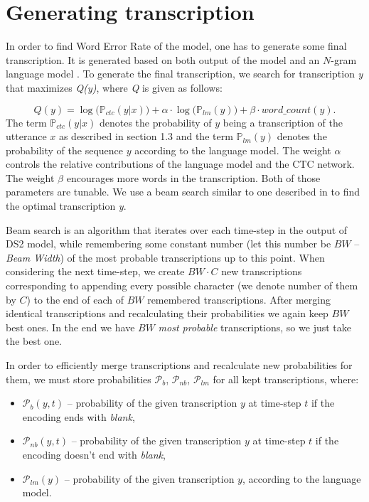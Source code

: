 \documentclass[licencjacka,en]{pracamgr}
\begin{document}
\section{Generating transcription} \label{sec:transcription}
In order to find Word Error Rate of the model, one has to generate some final transcription. It is generated based on both output of the model and an $N$-gram language model \cite{DS9}. To generate the final transcription, we search for transcription \textit{y} that maximizes \textit{Q(y)}, where \textit{Q} is given as follows:

$$
Q(y) = \log \big(\mathbb{P}_{ctc}(y|x)\big) + \alpha \cdot \log \big( \mathbb{P}_{lm}(y) \big) + \beta \cdot word\_count(y).
$$
The term $\mathbb{P}_{ctc}(y|x)$ denotes the probability of $y$ being a transcription of the utterance $x$ as described in section 1.3 and the term $\mathbb{P}_{lm}(y)$ denotes the probability of the sequence $y$ according to the language model. The weight $\alpha$ controls the relative contributions of the language model and the CTC network. The weight $\beta$ encourages more words in the transcription. Both of those parameters are tunable. We use a beam search similar to one described in \cite{DS7} to find the optimal transcription \textit{y}.

Beam search is an algorithm that iterates over each time-step in the output of DS2 model, while remembering some constant number (let this number be $BW$ -- \textit{Beam Width}) of the most probable transcriptions up to this point. When considering the next time-step, we create $BW \cdot C$ new transcriptions corresponding to appending every possible character (we denote number of them by $C$) to the end of each of $BW$ remembered transcriptions. After merging identical transcriptions and recalculating their probabilities we again keep $BW$ best ones. In the end we have $BW$ \textit{most probable} transcriptions, so we just take the best one.

In order to efficiently merge transcriptions and recalculate new probabilities for them, we must store probabilities $\mathcal{P}_{b}$, $\mathcal{P}_{nb}$, $\mathcal{P}_{lm}$ for all kept transcriptions, where:
\begin{itemize}
\item $\mathcal{P}_{b}(y, t)$ -- probability of the given transcription $y$ at time-step $t$ if the encoding ends with \textit{blank},
\item $\mathcal{P}_{nb}(y, t)$ -- probability of the given transcription $y$ at time-step $t$ if the encoding doesn't end with \textit{blank},
\item $\mathcal{P}_{lm}(y)$ -- probability of the given transcription $y$, according to the language model.\\
\end{itemize}
\end{document}

